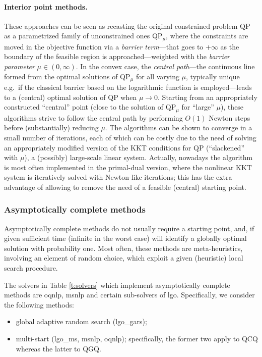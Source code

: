 \paragraph{Interior point methods.}
%
These approaches can be seen as recasting the original constrained problem QP as a parametrized family of unconstrained ones QP$_\mu$, where the constraints are moved in the objective function via a \emph{barrier term}---that goes to $+\infty$ as the boundary of the feasible region is approached---weighted with the \emph{barrier parameter} $\mu \in (0, \infty)$. In the convex case, the \emph{central path}---the continuous line formed from the optimal solutions of QP$_\mu$ for all varying $\mu$, typically unique e.g.~if the classical barrier based on the logarithmic function is employed---leads to a (central) optimal solution of QP when $\mu \to 0$. Starting from an appropriately constructed ``central'' point (close to the solution of QP$_\mu$ for ``large'' $\mu$), these algorithms strive to follow the central path by performing $O(1)$ Newton steps before (substantially) reducing $\mu$. The algorithms can be shown to converge in a small number of iterations, each of which can be costly due to the need of solving an appropriately modified version of the KKT conditions for QP (``slackened'' with $\mu$), a (possibly) large-scale linear system. Actually, nowadays the algorithm is most often implemented in the primal-dual version, where the nonlinear KKT system is iteratively solved with Newton-like iterations; this has the extra advantage of allowing to remove the need of a feasible (central) starting point.

\subsubsection{Asymptotically complete methods}\label{sss:asymc}

Asymptotically complete methods do not usually require a starting point, and, if given sufficient time (infinite in the worst case) will identify a globally optimal solution with probability one. Most often, these methods are meta-heuristics, involving an element of random choice, which exploit a given (heuristic) local search procedure.

The solvers in Table \ref{t:solvers} which implement asymptotically complete methods are {\sc oqnlp}, {\sc msnlp} and certain sub-solvers of {\sc lgo}. Specifically, we consider the following methods:
%
\begin{itemize}
 \item global adaptive random search ({\sc lgo\_gars});
 \item multi-start ({\sc lgo\_ms}, {\sc msnlp}, {\sc oqnlp}); specifically, the former two apply to QCQ whereas the latter to QGQ.
\end{itemize}

